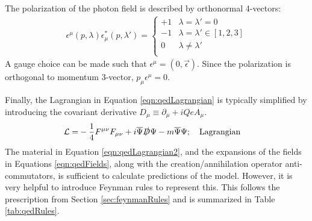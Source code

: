 The polarization of the photon field is described by orthonormal 4-vectors:
\begin{equation}\begin{split}
\epsilon^\mu(p,\lambda)\epsilon^*_\mu(p,\lambda') = \begin{cases}
    +1 &\lambda=\lambda'=0\\
    -1 &\lambda=\lambda'\in[1,2,3]\\
     0 &\lambda\ne\lambda'\\
\end{cases}
\end{split}\end{equation}
A gauge choice can be made such that $\epsilon^\mu=(0,\vec{\epsilon})$. 
Since the polarization is orthogonal to momentum 3-vector, $p_\mu\epsilon^\mu=0$.

Finally, the Lagrangian in Equation \ref{eqn:qedLagrangian} is typically simplified by introducing the covariant derivative $D_\mu\equiv\partial_\mu+iQeA_\mu$.
\begin{equation}\begin{split}\label{eqn:qedLagrangian2}
\mathcal{L}=&-\frac{1}{4}F^{\mu\nu}F_{\mu\nu}+i\overline{\Psi}\slashed{D}\Psi-m\overline{\Psi}\Psi; \quad\text{Lagrangian}
\end{split}\end{equation}
The material in Equation \ref{eqn:qedLagrangian2}, and the expansions of the fields in Equations \ref{eqn:qedFields}, along with the creation/annihilation operator anti-commutators, is sufficient to calculate predictions of the model.
However, it is very helpful to introduce Feynman rules to represent this.
This follows the prescription from Section \ref{sec:feynmanRules} and is summarized in Table \ref{tab:qedRules}.




